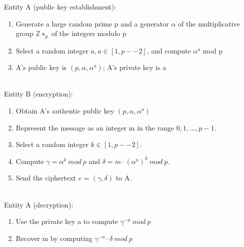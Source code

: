 \documentclass{report}
\begin{document}
Entity A (public key establishment):
\begin{enumerate}
\item Generate a large random prime p and a generator $\alpha$ of the multiplicative group $\mathbb{Z}∗_p$ of the integers modulo p
\item Select a random integer $a, a\in[1, p -− 2]$, and compute $\alpha^a$ mod p
\item A’s public key is $(p, \alpha, \alpha^a)$; A’s private key is a
\end{enumerate}
\\
Entity B (encryption):
\begin{enumerate}
\item Obtain A’s authentic public key $(p, \alpha, \alpha^a)$
\item Represent the message as an integer m in the range ${0, 1,..., p - 1}$.
\item Select a random integer $k \in [1, p −- 2]$.
\item Compute $\gamma = \alpha^k\: mod\: p$ and $\delta = m ·(\alpha^a)^k\: mod\: p$.
\item Send the ciphertext $c$ = $(\gamma, \delta)$ to A.
\end{enumerate}
\\
Entity A (decryption):
\begin{enumerate}
\item Use the private key a to compute $\gamma^{-a} \: mod \: p$
\item Recover m by computing $\gamma^{-a} \cdot \delta\: mod \: p$
\end{enumerate}
\\
\end{document}
